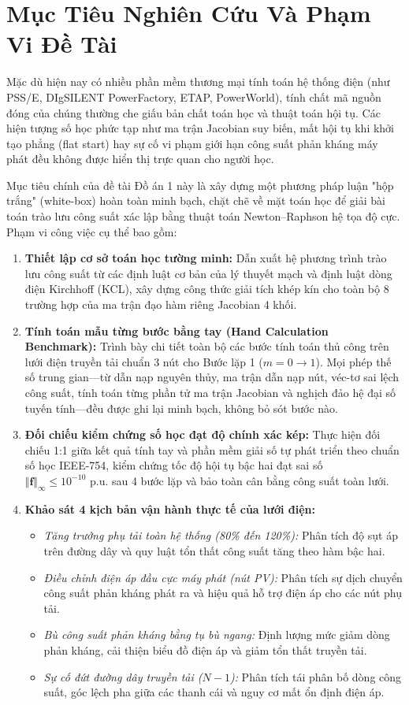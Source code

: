 \documentclass[12pt,a4paper,oneside]{report}
\begin{document}
\section{Mục Tiêu Nghiên Cứu Và Phạm Vi Đề Tài}
Mặc dù hiện nay có nhiều phần mềm thương mại tính toán hệ thống điện (như PSS/E, DIgSILENT PowerFactory, ETAP, PowerWorld), tính chất mã nguồn đóng của chúng thường che giấu bản chất toán học và thuật toán hội tụ. Các hiện tượng số học phức tạp như ma trận Jacobian suy biến, mất hội tụ khi khởi tạo phẳng (flat start) hay sự cố vi phạm giới hạn công suất phản kháng máy phát đều không được hiển thị trực quan cho người học.

Mục tiêu chính của đề tài Đồ án 1 này là xây dựng một phương pháp luận "hộp trắng" (white-box) hoàn toàn minh bạch, chặt chẽ về mặt toán học để giải bài toán trào lưu công suất xác lập bằng thuật toán Newton--Raphson hệ tọa độ cực. Phạm vi công việc cụ thể bao gồm:
\begin{enumerate}
    \item \textbf{Thiết lập cơ sở toán học tường minh:} Dẫn xuất hệ phương trình trào lưu công suất từ các định luật cơ bản của lý thuyết mạch và định luật dòng điện Kirchhoff (KCL), xây dựng công thức giải tích khép kín cho toàn bộ 8 trường hợp của ma trận đạo hàm riêng Jacobian 4 khối.
    \item \textbf{Tính toán mẫu từng bước bằng tay (Hand Calculation Benchmark):} Trình bày chi tiết toàn bộ các bước tính toán thủ công trên lưới điện truyền tải chuẩn 3 nút cho Bước lặp 1 ($m = 0 \to 1$). Mọi phép thế số trung gian---từ dẫn nạp nguyên thủy, ma trận dẫn nạp nút, véc-tơ sai lệch công suất, tính toán từng phần tử ma trận Jacobian và nghịch đảo hệ đại số tuyến tính---đều được ghi lại minh bạch, không bỏ sót bước nào.
    \item \textbf{Đối chiếu kiểm chứng số học đạt độ chính xác kép:} Thực hiện đối chiếu 1:1 giữa kết quả tính tay và phần mềm giải số tự phát triển theo chuẩn số học IEEE-754, kiểm chứng tốc độ hội tụ bậc hai đạt sai số $\Vert \mathbf{f} \Vert_\infty \le 10^{-10}\text{ p.u.}$ sau 4 bước lặp và bảo toàn cân bằng công suất toàn lưới.
    \item \textbf{Khảo sát 4 kịch bản vận hành thực tế của lưới điện:}
    \begin{itemize}
        \item \textit{Tăng trưởng phụ tải toàn hệ thống (80\% đến 120\%):} Phân tích độ sụt áp trên đường dây và quy luật tổn thất công suất tăng theo hàm bậc hai.
        \item \textit{Điều chỉnh điện áp đầu cực máy phát (nút PV):} Phân tích sự dịch chuyển công suất phản kháng phát ra và hiệu quả hỗ trợ điện áp cho các nút phụ tải.
        \item \textit{Bù công suất phản kháng bằng tụ bù ngang:} Định lượng mức giảm dòng phản kháng, cải thiện biểu đồ điện áp và giảm tổn thất truyền tải.
        \item \textit{Sự cố đứt đường dây truyền tải ($N-1$):} Phân tích tái phân bố dòng công suất, góc lệch pha giữa các thanh cái và nguy cơ mất ổn định điện áp.
    \end{itemize}
\end{enumerate}
\end{document}
